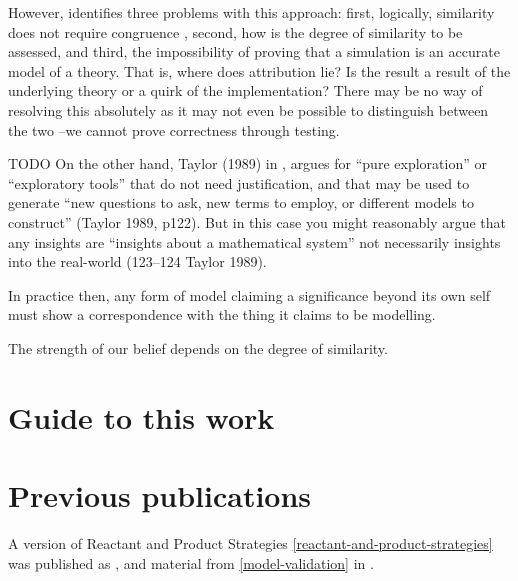 However, \autocite{Eldridge} identifies three problems with this
approach: first, logically, similarity does not require congruence
\autocite{Weitzenfeld1984}, second, how is the degree of similarity to
be assessed, and third, the impossibility of proving that a simulation
is an accurate model of a theory. That is, where does attribution lie?
Is the result a result of the underlying theory or a quirk of the
implementation? There may be no way of resolving this absolutely as it
may not even be possible to distinguish between the two
\autocite{DiPaolo2000}--we cannot prove correctness through testing.

TODO On the other hand, Taylor (1989) in \autocite{Webb2009}, argues for
``pure exploration'' or ``exploratory tools'' that do not need
justification, and that may be used to generate ``new questions to ask,
new terms to employ, or different models to construct'' (Taylor 1989,
p122). But in this case you might reasonably argue that any insights are
``insights about a mathematical system'' not necessarily insights into
the real-world (123–124 Taylor 1989).

In practice then, any form of model claiming a significance beyond its
own self must show a correspondence with the thing it claims to be
modelling.

The strength of our belief depends on the degree of similarity.

\section{Guide to this work}

\section{Previous publications}\label{previous-publications}

A version of Reactant and Product Strategies \cref{reactant-and-product-strategies} was published as \cite{Young2015},
and material from \cref{model-validation} in \cite{Young2013}.

